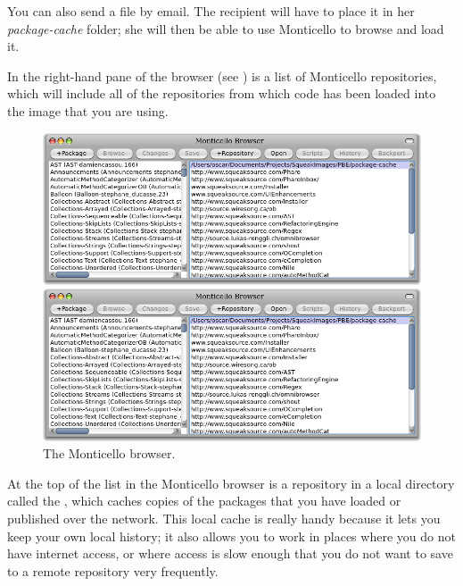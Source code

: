 \documentclass[a4paper,10pt,twoside]{book}
\begin{document}
{{You can also send a  file by email. 
The recipient will have to place it in her \emph{package-cache} folder; she will then be able to use Monticello to browse and load it. 

In the right-hand pane of the browser (see ) is a list of Monticello repositories, which will include all of the repositories from which code has been loaded into the image that you are using.  

\begin{figure}[hbt]
\ifluluelse
	{\centerline {\includegraphics[width=\textwidth]{MonticelloBrowser}}}
	{\centerline {\includegraphics[scale=0.7]{MonticelloBrowser}}}
\caption{The Monticello browser.
}
\end{figure}

At the top of the list in the Monticello browser is a repository in a local directory called the , which caches copies of the packages that you have loaded or published over the network. This local cache is really handy because it lets you keep your own local history; it also allows you to work in places where you do not have internet access, or where access is slow enough that you do not want to save to a remote repository very frequently.


}}
\end{document}
